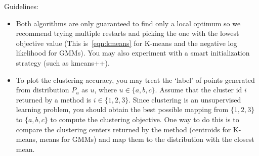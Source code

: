 \documentclass[a4paper]{article}
\newcounter{thm}
\theoremstyle{definition}
\begin{document}
Guidelines:
\begin{itemize} 
\item Both algorithms are only guaranteed to find only a local optimum so we recommend trying multiple
restarts and picking the one with the lowest objective value (This is~\eqref{eqn:kmeans} for K-means and the negative log likelihood for GMMs).
You may also experiment with a smart initialization
strategy (such as kmeans++).

\item
To plot the clustering accuracy,  you may treat the `label' of points generated from distribution
$P_u$ as $u$, where $u\in \{a, b, c\}$.
Assume that the cluster id $i$ returned by a method is $i\in \{1, 2, 3\}$.
Since clustering is an unsupervised learning problem, you should obtain the best possible mapping
from $\{1, 2, 3\}$ to $\{a, b, c\}$ to compute the clustering objective.
One way to do this is to compare the clustering centers returned by the method (centroids for
K-means, means for GMMs) and map them to the distribution with the closest mean.

\end{itemize}
\end{document}
